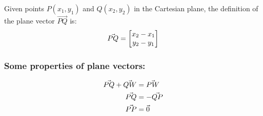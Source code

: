 \documentclass[../main.tex]{subfiles}
\begin{document}
Given points $P(x_1, y_1)$ and $Q(x_2, y_2)$ in the Cartesian plane, the definition of the plane vector $\vec{PQ}$ is:
\begin{align}
	\vec{PQ} = \begin{bmatrix} x_2 - x_1 \\ y_2 - y_1 \end{bmatrix} \notag
\end{align}

\subsubsection{Some properties of plane vectors:}
\begin{align}
	\vec{PQ} + \vec{QW} &= \vec{PW} \\ \notag
	\vec{PQ} &= -\vec{QP} \\ \notag
	\vec{PP} &= \vec{0} \notag
\end{align}
\end{document}
